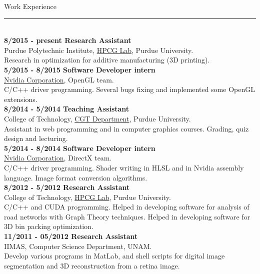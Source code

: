 \documentclass[letterpaper,10pt]{article}
\begin{document}
\begin{minipage}{0.5\textwidth}
\vspace*{0.5cm}
 {\large{Work Experience}} \\
 \textcolor{Dandelion}{\rule{0.5\textwidth}{0.05in}} \\
\textbf{8/2015 - present Research Assistant} \\
Purdue Polytechnic Institute, \href{http://hpcg.purdue.edu/}{HPCG Lab}, Purdue University. \\
Research in optimization for additive manufacturing (3D printing).\\

\textbf{5/2015 - 8/2015 Software Developer intern} \\
\href{http://www.nvidia.com/}{Nvidia Corporation}, OpenGL team. \\
C/C++ driver programming. Several bugs fixing and implemented some OpenGL extensions.\\

\textbf{8/2014 - 5/2014 Teaching Assistant} \\
College of Technology, \href{http://tech.purdue.edu/degrees/computer-graphics-technology}{CGT Department}, Purdue University. \\
Assistant in web programming and in computer graphics courses. Grading, quiz design and lecturing.\\

\textbf{5/2014 - 8/2014 Software Developer intern} \\
\href{http://www.nvidia.com/}{Nvidia Corporation}, DirectX team. \\
C/C++ driver programming. Shader writing in HLSL and in Nvidia assembly language. Image format conversion algorithms.\\

\textbf{8/2012 - 5/2012 Research Assistant} \\
College of Technology, \href{http://hpcg.purdue.edu/}{HPCG Lab}, Purdue University. \\
C/C++ and CUDA programming. Helped in developing software for analysis of road networks with Graph Theory techniques. Helped in developing software for 3D bin packing optimization.\\

\textbf{11/2011 - 05/2012 Research Assistant} \\
IIMAS, Computer Science Department, UNAM. \\
Develop various programs in MatLab, and shell scripts for digital image segmentation and 3D reconstruction from a retina image. \\


\end{minipage}
\end{document}
